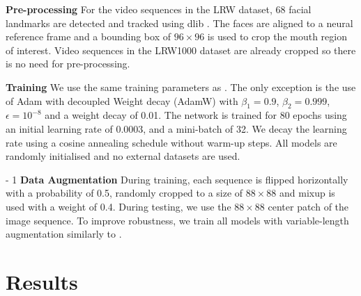\documentclass{article}
\begin{document}
\noindent\textbf{Pre-processing}\quad
For the video sequences in the LRW dataset, 68 facial landmarks are detected and tracked using dlib \cite{king2009dlib}. The faces are aligned to a neural reference frame and a bounding box of $96\times96$ is used to crop the mouth region of interest. Video sequences in the LRW1000 dataset are already cropped so there is no need for pre-processing.

\noindent\textbf{Training}\quad
We use the same training parameters as \cite{martinez2020lipreading}. The only exception is the use of Adam with decoupled Weight decay (AdamW) \cite{loshchilov2019decoupled} with $\beta_{1}=0.9$, $\beta_{2}=0.999$, $\epsilon=10^{-8}$ and a weight decay of 0.01. The network is trained for 80 epochs using an initial learning rate of 0.0003, and a mini-batch of 32. We decay the learning rate using a cosine annealing schedule without warm-up steps. All models are randomly initialised and no external datasets are used.

\looseness - 1
\noindent\textbf{Data Augmentation}\quad
During training, each sequence is flipped horizontally with a probability of 0.5, randomly cropped to a size of $88\times88$ and mixup \cite{zhang2017mixup} is used with a weight of 0.4. During testing, we use the $88\times88$ center patch of the image sequence. 
To improve robustness, we train all models with variable-length augmentation similarly to \cite{martinez2020lipreading}.


\section{Results}
\label{sec:results}
\end{document}

